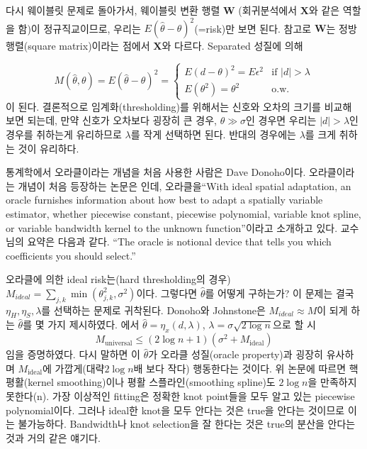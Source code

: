 \documentclass[b5paper,]{scrbook}
\theoremstyle{plain}
\theoremstyle{definition}
\numberwithin{equation}{section}
\begin{document}
다시 웨이블릿 문제로 돌아가서, 웨이블릿 변환 행렬 \(\mathbf{W}\) (회귀분석에서 \(\mathbf{X}\)와 같은 역할을 함)이 정규직교이므로, 우리는 \(E(\hat{\theta}-\theta)^{2}\)(=risk)만 보면 된다. 참고로 \(\mathbf{W}\)는 정방행렬(square matrix)이라는 점에서 \(\mathbf{X}\)와 다르다. Separated 성질에 의해

\[
M(\hat{\theta},\theta)=E(\hat{\theta}-\theta)^{2} =
\begin{cases}
E(d-\theta)^{2}=E\epsilon^{2} & \text{if $|d| > \lambda$}\\
E(\theta^{2})=\theta^{2} & \text{o.w.}
\end{cases}
\]
이 된다. 결론적으로 임계화(thresholding)를 위해서는 신호와 오차의 크기를 비교해 보면 되는데, 만약 신호가 오차보다 굉장히 큰 경우, \(\theta \gg \sigma\)인 경우면 우리는 \(|d| > \lambda\)인 경우를 취하는게 유리하므로 \(\lambda\)를 작게 선택하면 된다. 반대의 경우에는 \(\lambda\)를 크게 취하는 것이 유리하다.

통계학에서 오라클이라는 개념을 처음 사용한 사람은 Dave Donoho이다. 오라클이라는 개념이 처음 등장하는 논문은 \citep{Donoho1994}인데, 오라클을``With ideal spatial adaptation, an oracle furnishes information about how best to adapt a spatially variable estimator, whether piecewise constant, piecewise polynomial, variable knot spline, or variable bandwidth kernel to the unknown function''이라고 소개하고 있다. 교수님의 요약은 다음과 같다. ``The oracle is notional device that tells you which coefficients you should select.''

오라클에 의한 ideal risk는(hard thresholding의 경우) \(M_{ideal}=\sum_{j,k}\min(\theta_{j,k}^{2},\sigma^{2})\)이다. 그렇다면 \(\hat{\theta}\)를 어떻게 구하는가? 이 문제는 결국 \(\eta_{H}, \eta_{S}, \lambda\)를 선택하는 문제로 귀착된다. Donoho와 Johnstone은 \(M_{ideal}\approx M\)이 되게 하는 \(\hat{\theta}\)를 몇 가지 제시하였다. \citep{Donoho1994}에서 \(\hat{\theta}=\eta_{x}(d,\lambda)\), \(\lambda=\sigma\sqrt{2\log n}\)으로 할 시
\[M_{\text{universal}}\leq(2\log n +1)(\sigma^{2}+M_{\text{ideal}})\]
임을 증명하였다. 다시 말하면 이 \(\hat{\theta}\)가 오라클 성질(oracle property)과 굉장히 유사하며 \(M_{\text{ideal}}\)에 가깝게(대략\(2\log n\)배 보다 작다) 행동한다는 것이다. 위 논문에 따르면 핵평활(kernel smoothing)이나 평활 스플라인(smoothing spline)도 \(2\log n\)을 만족하지 못한다(n). 가장 이상적인 fitting은 정확한 knot point들을 모두 알고 있는 piecewise polynomial이다. 그러나 ideal한 knot을 모두 안다는 것은 true을 안다는 것이므로 이는 불가능하다. Bandwidth나 knot selection을 잘 한다는 것은 true의 분산을 안다는 것과 거의 같은 얘기다.
\end{document}
